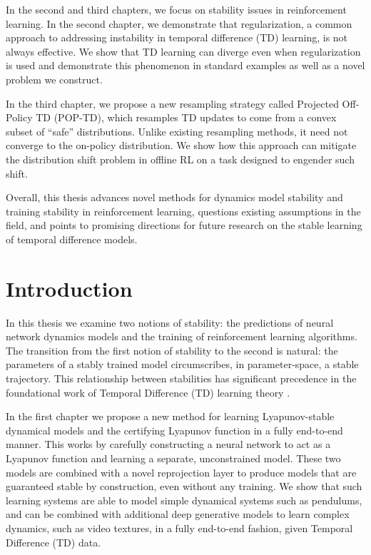 \documentclass[11pt]{book}
\begin{document}
In the second and third chapters, we focus on stability issues in reinforcement learning. In the second chapter, we demonstrate that regularization, a common approach to addressing instability in temporal difference (TD) learning, is not always effective. We show that TD learning can diverge even when regularization is used and demonstrate this phenomenon in standard examples as well as a novel problem we construct.

In the third chapter, we propose a new resampling strategy called Projected Off-Policy TD (POP-TD), which resamples TD updates to come from a convex subset of ``safe'' distributions. Unlike existing resampling methods, it need not converge to the on-policy distribution. We show how this approach can mitigate the distribution shift problem in offline RL on a task designed to engender such shift.

Overall, this thesis advances novel methods for dynamics model stability and training stability in reinforcement learning, questions existing assumptions in the field, and points to promising directions for future research on the stable learning of temporal difference models.


\clearpage

\tableofcontents

\cleardoublepage

\linenumbers

\chapter{Introduction}

In this thesis we examine two notions of stability: the predictions of neural network dynamics models and the training of reinforcement learning algorithms. The transition from the first notion of stability to the second is natural: the parameters of a stably trained model circumscribes, in parameter-space, a stable trajectory.
This relationship between stabilities has significant precedence in the foundational work of Temporal Difference (TD) learning theory \cite{tsitsiklis1996analysis}. %

In the first chapter we propose a new method for learning Lyapunov-stable dynamical models and the certifying Lyapunov function in a fully end-to-end manner.
This works by carefully constructing a neural network to act as a Lyapunov function and learning a separate, unconstrained model. These two models are combined with a novel reprojection layer to produce models that are guaranteed stable by construction, even without any training. We show that such learning systems are able to model simple dynamical systems such as pendulums, and can be combined with additional deep generative models to learn complex dynamics, such as video textures, in a fully end-to-end fashion, given Temporal Difference (TD) data.
\end{document}
